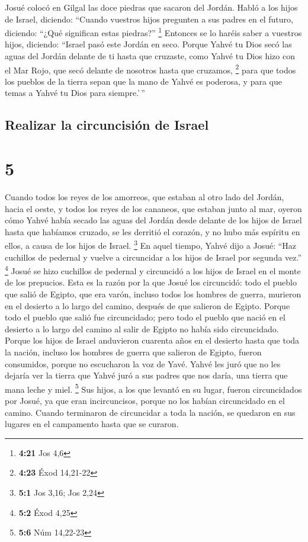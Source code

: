  Josué colocó en Gilgal las doce piedras que sacaron del
Jordán.  Habló a los hijos de Israel, diciendo: ``Cuando
vuestros hijos pregunten a sus padres en el futuro, diciendo: ``¿Qué
significan estas piedras?'' \footnote{\textbf{4:21} Jos 4,6}
 Entonces se lo haréis saber a vuestros hijos, diciendo:
``Israel pasó este Jordán en seco.  Porque Yahvé tu Dios
secó las aguas del Jordán delante de ti hasta que cruzaste, como Yahvé
tu Dios hizo con el Mar Rojo, que secó delante de nosotros hasta que
cruzamos, \footnote{\textbf{4:23} Éxod 14,21-22}  para
que todos los pueblos de la tierra sepan que la mano de Yahvé es
poderosa, y para que temas a Yahvé tu Dios para siempre.'\,''

\hypertarget{realizar-la-circuncisiuxf3n-de-israel}{%
\subsection{Realizar la circuncisión de
Israel}\label{realizar-la-circuncisiuxf3n-de-israel}}

\hypertarget{section-4}{%
\section{5}\label{section-4}}

 Cuando todos los reyes de los amorreos, que estaban al
otro lado del Jordán, hacia el oeste, y todos los reyes de los cananeos,
que estaban junto al mar, oyeron cómo Yahvé había secado las aguas del
Jordán desde delante de los hijos de Israel hasta que habíamos cruzado,
se les derritió el corazón, y no hubo más espíritu en ellos, a causa de
los hijos de Israel. \footnote{\textbf{5:1} Jos 3,16; Jos 2,24}
 En aquel tiempo, Yahvé dijo a Josué: ``Haz cuchillos de
pedernal y vuelve a circuncidar a los hijos de Israel por segunda vez.''
\footnote{\textbf{5:2} Éxod 4,25}  Josué se hizo cuchillos
de pedernal y circuncidó a los hijos de Israel en el monte de los
prepucios.  Esta es la razón por la que Josué los
circuncidó: todo el pueblo que salió de Egipto, que era varón, incluso
todos los hombres de guerra, murieron en el desierto a lo largo del
camino, después de que salieron de Egipto.  Porque todo el
pueblo que salió fue circuncidado; pero todo el pueblo que nació en el
desierto a lo largo del camino al salir de Egipto no había sido
circuncidado.  Porque los hijos de Israel anduvieron
cuarenta años en el desierto hasta que toda la nación, incluso los
hombres de guerra que salieron de Egipto, fueron consumidos, porque no
escucharon la voz de Yavé. Yahvé les juró que no les dejaría ver la
tierra que Yahvé juró a sus padres que nos daría, una tierra que mana
leche y miel. \footnote{\textbf{5:6} Núm 14,22-23}  Sus
hijos, a los que levantó en su lugar, fueron circuncidados por Josué, ya
que eran incircuncisos, porque no los habían circuncidado en el camino.
 Cuando terminaron de circuncidar a toda la nación, se
quedaron en sus lugares en el campamento hasta que se curaron.

